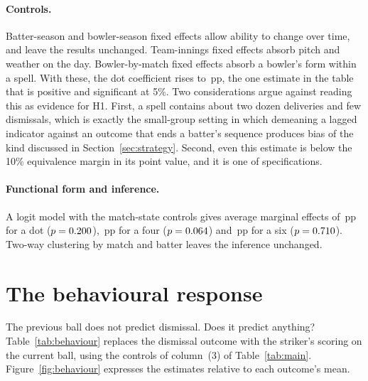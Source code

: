\documentclass[11pt]{article}
\newcommand{\pp}{\,pp}
\begin{document}
\paragraph{Controls.} Batter-season and bowler-season fixed effects allow ability to change over time, and leave the results unchanged. Team-innings fixed effects absorb pitch and weather on the day. Bowler-by-match fixed effects absorb a bowler's form within a spell. With these, the dot coefficient rises to \RobDotMax\pp{}, the one estimate in the table that is positive and significant at 5\%. Two considerations argue against reading this as evidence for H1. First, a spell contains about two dozen deliveries and few dismissals, which is exactly the small-group setting in which demeaning a lagged indicator against an outcome that ends a batter's sequence produces bias of the kind discussed in Section~\ref{sec:strategy}. Second, even this estimate is below the 10\% equivalence margin in its point value, and it is one of \RobRows{} specifications.

\paragraph{Functional form and inference.} A logit model with the match-state controls gives average marginal effects of \LogitDot\pp{} for a dot ($p=0.200$), \LogitFour\pp{} for a four ($p=0.064$) and \LogitSix\pp{} for a six ($p=0.710$). Two-way clustering by match and batter \citep{cameron2011robust} leaves the inference unchanged.

\section{The behavioural response}\label{sec:behaviour}

The previous ball does not predict dismissal. Does it predict anything? Table~\ref{tab:behaviour} replaces the dismissal outcome with the striker's scoring on the current ball, using the controls of column~(3) of Table~\ref{tab:main}. Figure~\ref{fig:behaviour} expresses the estimates relative to each outcome's mean.
\end{document}
